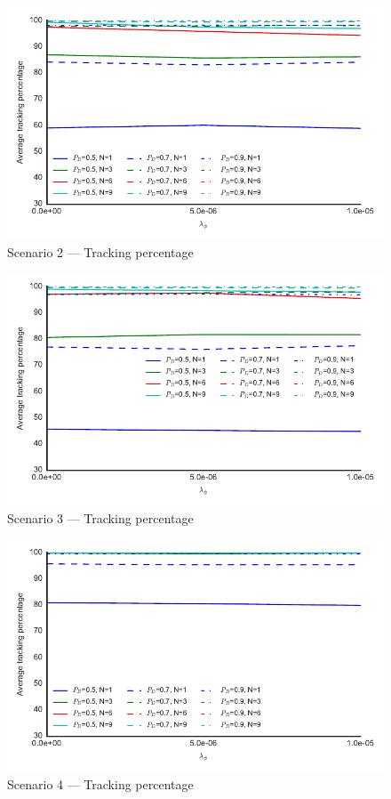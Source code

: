 \begin{figure}
\includegraphics{Figures/plots/Scenario2_Tracking-TrackingPercentage.pdf}
\caption{Scenario 2 --- Tracking percentage}\label{fig:scenario2_tracking_percentage}
\end{figure}
\begin{figure}
\centering
\includegraphics{Figures/plots/Scenario3_Tracking-TrackingPercentage.pdf}
\caption{Scenario 3 --- Tracking percentage}\label{fig:scenario3_tracking_percentage}
\end{figure}
\begin{figure}
\includegraphics{Figures/plots/Scenario4_Tracking-TrackingPercentage.pdf}
\caption{Scenario 4 --- Tracking percentage}\label{fig:scenario4_tracking_percentage}
\end{figure}
\clearpage{}

